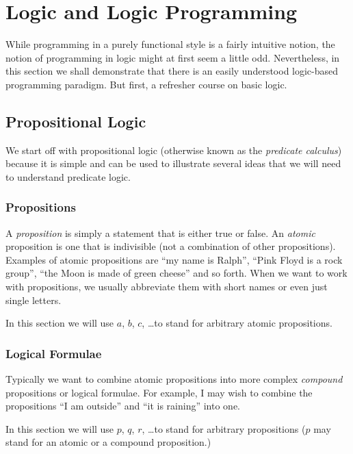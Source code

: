 
\chapter{Logic and Logic Programming}

While programming in a purely functional style is a fairly intuitive
notion, the notion of programming in logic might at first seem a little
odd.  Nevertheless, in this section we shall demonstrate that there is
an easily understood logic-based programming paradigm.  But first, a
refresher course on basic logic.

\section{Propositional Logic}

We start off with propositional logic (otherwise known as the
\emph{predicate calculus}) because it is simple and can be used to
illustrate several ideas that we will need to understand predicate
logic.

\subsection{Propositions}

A \emph{proposition} is simply a statement that is either true or false.
An \emph{atomic} proposition is one that is indivisible (\ie not a
combination of other propositions).  Examples of atomic propositions are
``my name is Ralph'', ``Pink Floyd is a rock group'', ``the Moon is made
of green cheese'' and so forth.  When we want to work with propositions,
we usually abbreviate them with short names or even just single letters.

In this section we will use $a$, $b$, $c$, \ldots to stand for arbitrary
atomic propositions.

\subsection{Logical Formulae}

Typically we want to combine atomic propositions into more complex
\emph{compound} propositions or logical formulae.  For example, I may
wish to combine the propositions ``I am outside'' and ``it is raining''
into one.

In this section we will use $p$, $q$, $r$, \ldots to stand for arbitrary
propositions (\ie $p$ may stand for an atomic or a compound
proposition.)

